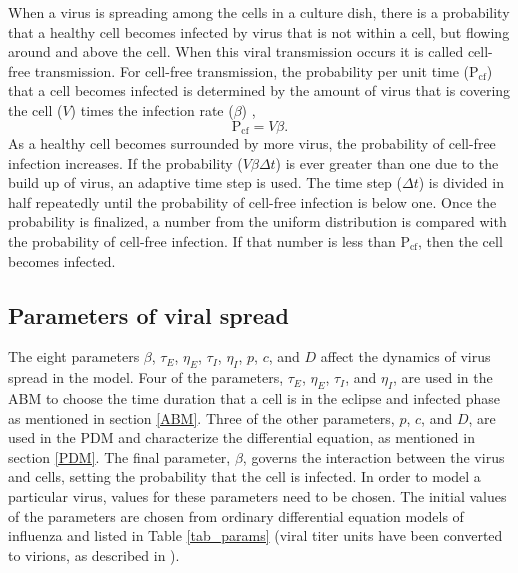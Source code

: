 When a virus is spreading among the cells in a culture dish, there is a probability that a healthy cell becomes infected by virus that is not within a cell, but flowing around and above the cell. When this viral transmission occurs it is called cell-free transmission. For cell-free transmission, the probability per unit time ($\mathrm{P_{cf}}$) that a cell becomes infected is determined by the amount of virus that is covering the cell ($V$) times the infection rate ($\beta$) \citep{holder11autoimm}, 
$$\mathrm{P_{cf}} = V \beta.$$ 
As a healthy cell becomes surrounded by more virus, the probability of cell-free infection increases. If the probability ($V \beta \Delta t$) is ever greater than one due to the build up of virus, an adaptive time step is used. The time step ($\Delta t$) is divided in half repeatedly until the probability of cell-free infection is below one. Once the probability is finalized, a number from the uniform distribution is compared with the probability of cell-free infection. If that number is less than $\mathrm{P_{cf}}$, then the cell becomes infected.


\subsection{Parameters of viral spread}

The eight parameters $\beta$, $\tau_E$, $\eta_E$, $\tau_I$, $\eta_I$, $p$, $c$, and $D$ affect the dynamics of virus spread in the model. Four of the parameters, $\tau_E$, $\eta_E$, $\tau_I$, and $\eta_I$, are used in the ABM to choose the time duration that a cell is in the eclipse and infected phase as mentioned in section \ref{ABM}. Three of the other parameters, $p$, $c$, and $D$, are used in the PDM and characterize the differential equation, as mentioned in section \ref{PDM}. The final parameter, $\beta$, governs the interaction between the virus and cells, setting the probability that the cell is infected. In order to model a particular virus, values for these parameters need to be chosen. The initial values of the parameters are chosen from ordinary differential equation models of influenza and listed in Table \ref{tab_params} (viral titer units have been converted to virions, as described in \citep{dobrovolny17}). %

